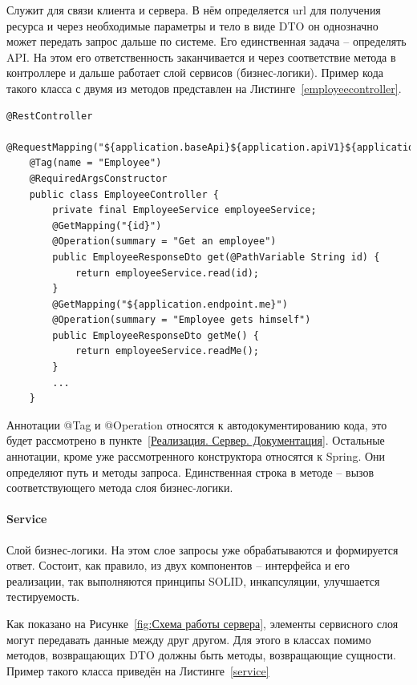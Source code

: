 \documentclass[a4paper,article]{article}
\begin{document}
\begin{sloppypar}
    Служит для связи клиента и сервера. В нём определяется url для получения ресурса и через необходимые параметры и тело в виде DTO он однозначно может передать запрос дальше по системе. Его единственная задача -- определять API. На этом его ответственность заканчивается и через соответствие метода в контроллере и дальше работает слой сервисов (бизнес-логики). Пример кода такого класса с двумя из методов представлен на Листинге~\ref{employeecontroller}.

    \begin{lstlisting}[label=employeecontroller,caption=Пример класса слоя представления]
    @RestController
    @RequestMapping("${application.baseApi}${application.apiV1}${application.endpoint.employees}")
    @Tag(name = "Employee")
    @RequiredArgsConstructor
    public class EmployeeController {
        private final EmployeeService employeeService;
        @GetMapping("{id}")
        @Operation(summary = "Get an employee")
        public EmployeeResponseDto get(@PathVariable String id) {
            return employeeService.read(id);
        }
        @GetMapping("${application.endpoint.me}")
        @Operation(summary = "Employee gets himself")
        public EmployeeResponseDto getMe() {
            return employeeService.readMe();
        }
        ...
    }
    \end{lstlisting}

    Аннотации @Tag и @Operation относятся к автодокументированию кода, это будет рассмотрено в пункте~\ref{Реализация. Сервер. Документация}. Остальные аннотации, кроме уже рассмотренного конструктора относятся к Spring. Они определяют путь и методы запроса. Единственная строка в методе -- вызов соответствующего метода слоя бизнес-логики.

    \paragraph{Service}\label{Реализация. Сервер. Service}

    Слой бизнес-логики. На этом слое запросы уже обрабатываются и формируется ответ. Состоит, как правило, из двух компонентов -- интерфейса и его реализации, так выполняются принципы SOLID, инкапсуляции, улучшается тестируемость.

    Как показано на Рисунке~\ref{fig:Схема работы сервера}, элементы сервисного слоя могут передавать данные между друг другом. Для этого в классах помимо методов, возвращающих DTO должны быть методы, возвращающие сущности. Пример такого класса приведён на Листинге~\ref{service}


\end{sloppypar}
\end{document}
